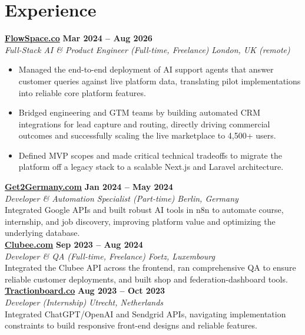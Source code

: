 \documentclass[a4paper,10pt]{article}
\newcommand{\role}[4]{%
 \textbf{#1} \hfill \textbf{#2}\\[1pt]%
 \textit{#3} \hfill \textit{#4}\\[2pt]%
}
\begin{document}
\section{Experience}

\role{\href{https://flowspace.co}{FlowSpace.co}}{Mar 2024 -- Aug 2026}{Full-Stack AI \& Product Engineer (Full-time, Freelance)}{London, UK (remote)}
\begin{itemize}
 \item Managed the end-to-end deployment of AI support agents that answer customer queries against live platform data, translating pilot implementations into reliable core platform features.
 \item Bridged engineering and GTM teams by building automated CRM integrations for lead capture and routing, directly driving commercial outcomes and successfully scaling the live marketplace to 4,500+ users.
 \item Defined MVP scopes and made critical technical tradeoffs to migrate the platform off a legacy stack to a scalable Next.js and Laravel architecture.
\end{itemize}

\role{\href{https://get2germany.com}{Get2Germany.com}}{Jan 2024 -- May 2024}{Developer \& Automation Specialist (Part-time)}{Berlin, Germany}
Integrated Google APIs and built robust AI tools in n8n to automate course, internship, and job discovery, improving platform value and optimizing the underlying database.\\[1pt]

\role{\href{https://clubee.com}{Clubee.com}}{Sep 2023 -- Aug 2024}{Developer \& QA (Full-time, Freelance)}{Foetz, Luxembourg}
Integrated the Clubee API across the frontend, ran comprehensive QA to ensure reliable customer deployments, and built shop and federation-dashboard tools.\\[1pt]

\role{\href{https://tractionboard.co}{Tractionboard.co}}{Aug 2023 -- Oct 2023}{Developer (Internship)}{Utrecht, Netherlands}
Integrated ChatGPT/OpenAI and Sendgrid APIs, navigating implementation constraints to build responsive front-end designs and reliable features.

\end{document}
